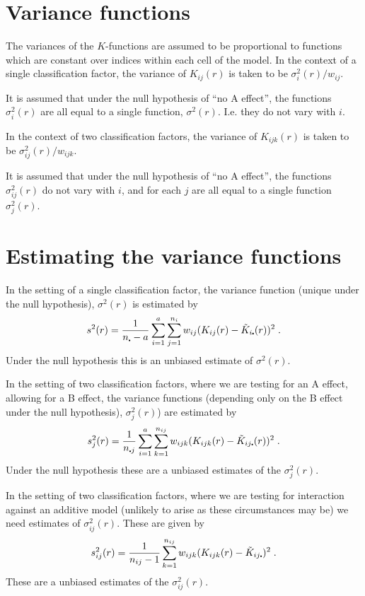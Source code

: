\documentclass[12pt]{article}
\newcommand{\pt}{\mbox{\scalebox{0.4}{$\bullet$}}}
\begin{document}
\section{Variance functions}
The variances of the $K$-functions are assumed to be proportional
to functions which are constant over indices within each cell
of the model.  In the context of a single classification factor,
the variance of $K_{ij}(r)$ is taken to be $\sigma_i^2(r)/w_{ij}$.

It is assumed that under the null hypothesis of ``no A effect'',
the functions $\sigma_i^2(r)$ are all equal to a single function,
$\sigma^2(r)$.  I.e. they do not vary with $i$.

In the context of two classification factors, the variance of
$K_{ijk}(r)$ is taken to be $\sigma_{ij}^2(r)/w_{ijk}$.

It is assumed that under the null hypothesis of ``no A effect'',
the functions $\sigma_{ij}^2(r)$ do not vary with $i$, and for
each $j$ are all equal to a single function $\sigma_j^2(r)$.

\section{Estimating the variance functions}

In the setting of a single classification factor, the variance function
(unique under the null hypothesis), $\sigma^2(r)$ is estimated by
\[
s^2(r) = \frac{1}{n_{\pt} - a} \sum_{i=1}^a \sum_{j=1}^{n_i}
         w_{ij}(K_{ij}(r) - \tilde{K}_{i\pt}(r))^2 \; .
\]
Under the null hypothesis this is an unbiased estimate of $\sigma^2(r)$.

In the setting of two classification factors, where we are testing
for an A effect, allowing for a B effect, the variance functions
(depending only on the B effect under the null hypothesis),
$\sigma^2_j(r)$) are estimated by
\[
s^2_j(r) = \frac{1}{n_{\pt j}} \sum_{i=1}^a \sum_{k=1}^{n_{ij}}
                               w_{ijk}(K_{ijk}(r) - \tilde{K}_{ij\pt}(r))^2 \; .
\]
Under the null hypothesis these are a unbiased estimates of the $\sigma^2_j(r)$.

In the setting of two classification factors, where we are testing for
interaction against an additive model (unlikely to arise as these circumstances
may be) we need estimates of $\sigma^2_{ij}(r)$.  These are given by
\[
s^2_{ij}(r) = \frac{1}{n_{ij} - 1} \sum_{k=1}^{n_{ij}} w_{ijk}(K_{ijk}(r)
                                            - \tilde{K}_{ij\pt})^2 \; .
\]
These are a unbiased estimates of the $\sigma^2_{ij}(r)$.
\end{document}
